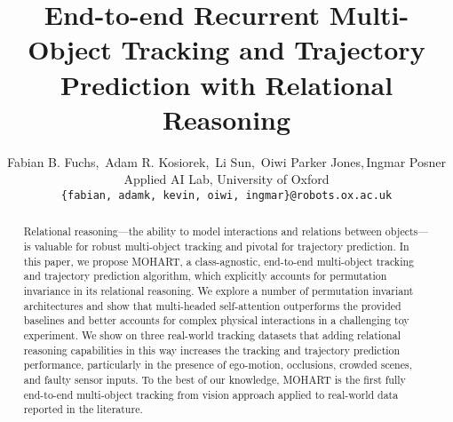 \documentclass{article} %
\title{End-to-end Recurrent Multi-Object Tracking and Trajectory Prediction with Relational Reasoning}
\author{Fabian B. Fuchs,\, Adam R. Kosiorek,\, Li Sun,\, Oiwi Parker Jones,\,Ingmar Posner\\
Applied AI Lab,  University of Oxford \\
\texttt{\{fabian, adamk, kevin, oiwi, ingmar\}@robots.ox.ac.uk} \\
}
\begin{document}
\maketitle

\begin{abstract}
    
	Relational reasoning---the ability to model interactions and relations between objects---is valuable for robust multi-object tracking and pivotal for trajectory prediction. In this paper, we propose MOHART, a class-agnostic, end-to-end multi-object tracking and trajectory prediction algorithm, which explicitly accounts for permutation invariance in its relational reasoning. We explore a number of permutation invariant architectures and show that multi-headed self-attention outperforms the provided baselines and better accounts for complex physical interactions in a challenging toy experiment. We show on three real-world tracking datasets that adding relational reasoning capabilities in this way increases the tracking and trajectory prediction performance, particularly in the presence of ego-motion, occlusions, crowded scenes, and faulty sensor inputs. To the best of our knowledge, MOHART is the first fully end-to-end multi-object tracking from vision approach applied to real-world data reported in the literature. 


\end{abstract}
\end{document}
